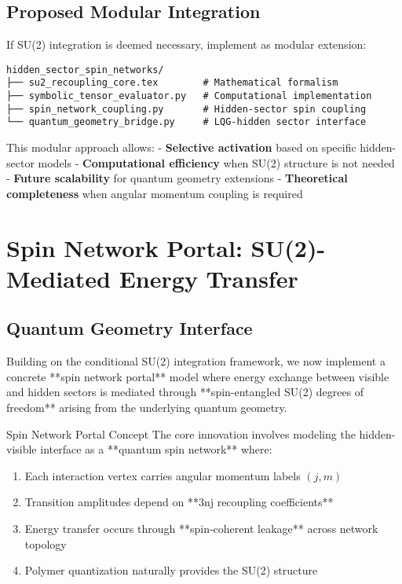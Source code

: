\documentclass[12pt]{article}
\begin{document}
\subsection{Proposed Modular Integration}

If SU(2) integration is deemed necessary, implement as modular extension:

\begin{verbatim}
hidden_sector_spin_networks/
├── su2_recoupling_core.tex        # Mathematical formalism
├── symbolic_tensor_evaluator.py   # Computational implementation  
├── spin_network_coupling.py       # Hidden-sector spin coupling
└── quantum_geometry_bridge.py     # LQG-hidden sector interface
\end{verbatim}

This modular approach allows:
- \textbf{Selective activation} based on specific hidden-sector models
- \textbf{Computational efficiency} when SU(2) structure is not needed  
- \textbf{Future scalability} for quantum geometry extensions
- \textbf{Theoretical completeness} when angular momentum coupling is required

\section{Spin Network Portal: SU(2)-Mediated Energy Transfer}

\subsection{Quantum Geometry Interface}

Building on the conditional SU(2) integration framework, we now implement a concrete **spin network portal** model where energy exchange between visible and hidden sectors is mediated through **spin-entangled SU(2) degrees of freedom** arising from the underlying quantum geometry.

\begin{physicsbox}{Spin Network Portal Concept}
The core innovation involves modeling the hidden-visible interface as a **quantum spin network** where:
\begin{enumerate}
\item Each interaction vertex carries angular momentum labels $(j, m)$
\item Transition amplitudes depend on **3nj recoupling coefficients**
\item Energy transfer occurs through **spin-coherent leakage** across network topology
\item Polymer quantization naturally provides the SU(2) structure
\end{enumerate}
\end{physicsbox}
\end{document}
